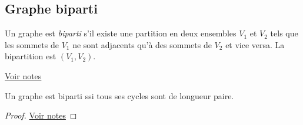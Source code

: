 \subsection{Graphe biparti}
\begin{mydef}
  Un graphe est \emph{biparti}  s'il existe une partition en deux ensembles $V_1$ et $V_2$ tels que les sommets de $V_1$ ne sont adjacents qu'à des sommets de $V_2$ et vice versa. La bipartition est $(V_1, V_2)$.
\end{mydef}

\begin{myexem}
  \href{https://dl.dropboxusercontent.com/u/44092863/Graph_Theory_Romain_Capron.pdf}{Voir notes} \addTODO
\end{myexem}

\begin{mytheo} 
  Un graphe est biparti ssi tous ses cycles sont de longueur paire.
  \begin{proof}
     \href{https://dl.dropboxusercontent.com/u/44092863/Graph_Theory_Romain_Capron.pdf}{Voir notes} \addTODO
  \end{proof}
\end{mytheo}
